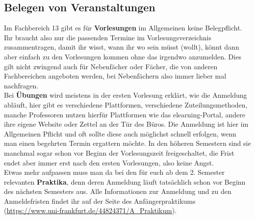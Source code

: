 \subsection{Belegen von Veranstaltungen}
\label{subsec:belegen_von_veranstaltungen}
Im Fachbereich 13 gibt es für \textbf{Vorlesungen} im Allgemeinen keine Belegpflicht. Ihr braucht also nur die passenden Termine im Vorlesungsverzeichnis zusammentragen, damit ihr wisst, wann ihr wo sein müsst (wollt), könnt dann aber einfach zu den Vorlesungen kommen ohne das irgendwo anzumelden. Dies gilt nicht zwingend auch für Nebenfächer oder Fächer, die von anderen Fachbereichen angeboten werden, bei Nebenfächern also immer lieber mal nachfragen.\\
Bei \textbf{Übungen} wird meistens in der ersten Vorlesung erklärt, wie die Anmeldung abläuft, hier gibt es verschiedene Plattformen, verschiedene Zuteilungsmethoden, manche Professoren nutzen hierfür Plattformen wie das elearning-Portal, andere ihre eigene Website oder Zettel an der Tür des Büros. Die Anmeldung ist hier im Allgemeinen Pflicht und oft sollte diese auch möglichst schnell erfolgen, wenn man einen begehrten Termin ergattern möchte. In den höheren Semestern sind sie manchmal sogar schon vor Beginn der Vorlesungszeit freigeschaltet, die Frist endet aber immer erst nach den ersten Vorlesungen, also keine Angst.\\
Etwas mehr aufpassen muss man da bei den für euch ab dem 2. Semester relevanten \textbf{Praktika}, denn deren Anmeldung läuft tatsächlich schon vor Beginn des nächsten Semesters aus. Alle Informationen zur Anmeldung und zu den Anmeldefristen findet ihr auf der Seite des Anfängerpraktikums (\url{https://www.uni-frankfurt.de/44824371/A_Praktikum}).
